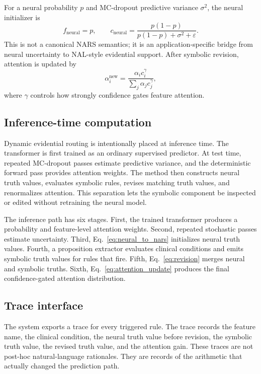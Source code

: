 \documentclass{article}
\begin{document}
For a neural probability $p$ and MC-dropout predictive variance $\sigma^2$, the neural initializer is
\begin{equation}
f_{\text{neural}}=p,\qquad
c_{\text{neural}}=\frac{p(1-p)}{p(1-p)+\sigma^2+\varepsilon}.
\label{eq:neural_to_nars}
\end{equation}
This is not a canonical NARS semantics; it is an application-specific bridge from neural uncertainty to NAL-style evidential support. After symbolic revision, attention is updated by
\begin{equation}
\alpha_i^{\text{new}}=
\frac{\alpha_i c_i^\gamma}{\sum_j \alpha_j c_j^\gamma},
\label{eq:attention_update}
\end{equation}
where $\gamma$ controls how strongly confidence gates feature attention.

\subsection{Inference-time computation}

Dynamic evidential routing is intentionally placed at inference time. The transformer is first trained as an ordinary supervised predictor. At test time, repeated MC-dropout passes estimate predictive variance, and the deterministic forward pass provides attention weights. The method then constructs neural truth values, evaluates symbolic rules, revises matching truth values, and renormalizes attention. This separation lets the symbolic component be inspected or edited without retraining the neural model.

The inference path has six stages. First, the trained transformer produces a probability and feature-level attention weights. Second, repeated stochastic passes estimate uncertainty. Third, Eq.~\ref{eq:neural_to_nars} initializes neural truth values. Fourth, a proposition extractor evaluates clinical conditions and emits symbolic truth values for rules that fire. Fifth, Eq.~\ref{eq:revision} merges neural and symbolic truths. Sixth, Eq.~\ref{eq:attention_update} produces the final confidence-gated attention distribution.

\subsection{Trace interface}

The system exports a trace for every triggered rule. The trace records the feature name, the clinical condition, the neural truth value before revision, the symbolic truth value, the revised truth value, and the attention gain. These traces are not post-hoc natural-language rationales. They are records of the arithmetic that actually changed the prediction path.
\end{document}
